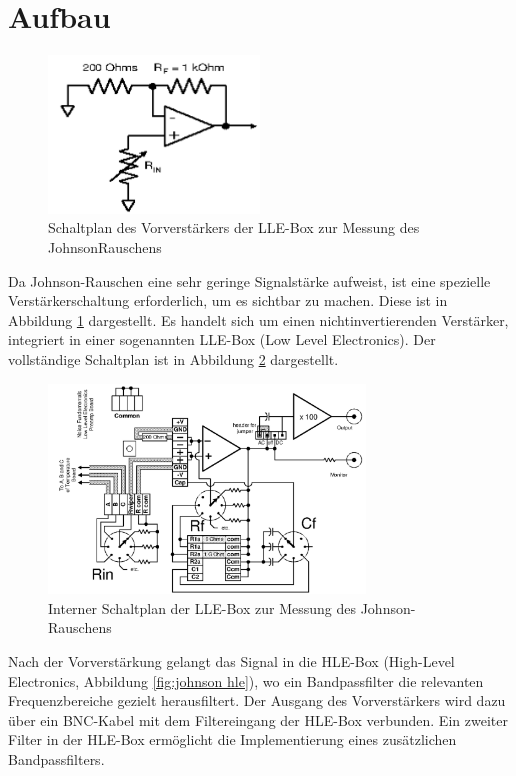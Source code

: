 \section{Aufbau}
\FloatBarrier
\begin{figure}[htbp]
    \centering
    \includegraphics[width=0.5\textwidth]{figs/schalt amplifier.png}
    \caption{Schaltplan des Vorverstärkers der LLE-Box zur Messung des JohnsonRauschens \cite{praktikum}}
    \label{fig:schaltamplifier}
\end{figure}
\FloatBarrier
Da Johnson-Rauschen eine sehr geringe Signalstärke aufweist, ist eine spezielle Verstärkerschaltung erforderlich, um es sichtbar zu machen. Diese ist in Abbildung \ref{fig:schaltamplifier} dargestellt. Es handelt sich um einen nichtinvertierenden Verstärker, integriert in einer sogenannten LLE-Box (Low Level Electronics). Der vollständige Schaltplan ist in Abbildung \ref{fig:johnson lle} dargestellt.
\FloatBarrier
\begin{figure}[htbp]
    \centering
    \includegraphics[width=0.75\textwidth]{figs/johnson lle.png}
    \caption{Interner Schaltplan der LLE-Box zur Messung des Johnson-Rauschens \cite{praktikum}}
    \label{fig:johnson lle}
\end{figure}
\FloatBarrier
Nach der Vorverstärkung gelangt das Signal in die HLE-Box (High-Level Electronics, Abbildung \ref{fig:johnson hle}), wo ein Bandpassfilter die relevanten Frequenzbereiche gezielt herausfiltert. Der Ausgang des Vorverstärkers wird dazu über ein BNC-Kabel mit dem Filtereingang der HLE-Box verbunden. Ein zweiter Filter in der HLE-Box ermöglicht die Implementierung eines zusätzlichen Bandpassfilters.
